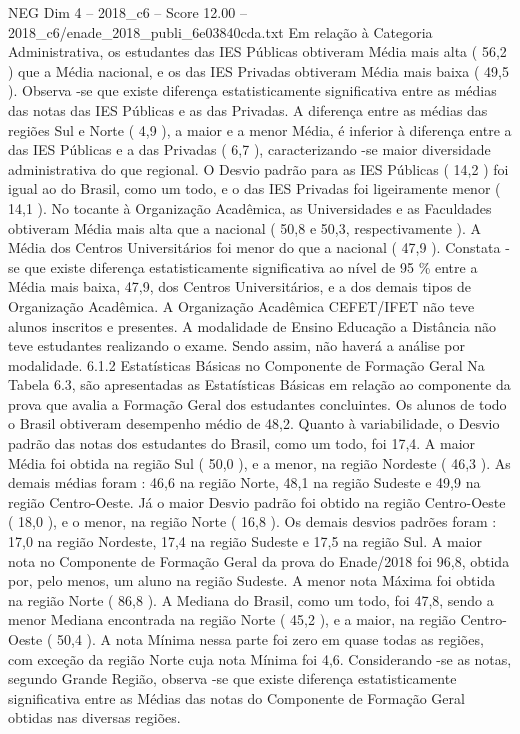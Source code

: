 \begin{textsample}{NEG Dim 4 – 2018\_c6 – Score 12.00 – 2018\_c6/enade\_2018\_publi\_6e03840cda.txt}
Em relação à Categoria Administrativa, os estudantes das IES Públicas obtiveram Média mais alta ( 56,2 ) que a Média nacional, e os das IES Privadas obtiveram Média mais baixa ( 49,5 ).
Observa -se que existe diferença estatisticamente significativa entre as médias das notas das IES Públicas e as das Privadas.
A diferença entre as médias das regiões Sul e Norte ( 4,9 ), a maior e a menor Média, é inferior à diferença entre a das IES Públicas e a das Privadas ( 6,7 ), caracterizando -se maior diversidade administrativa do que regional.
O Desvio padrão para as IES Públicas ( 14,2 ) foi igual ao do Brasil, como um todo, e o das IES Privadas foi ligeiramente menor ( 14,1 ).
No tocante à Organização Acadêmica, as Universidades e as Faculdades obtiveram Média mais alta que a nacional ( 50,8 e 50,3, respectivamente ).
A Média dos Centros Universitários foi menor do que a nacional ( 47,9 ).
Constata -se que existe diferença estatisticamente significativa ao nível de 95 \% entre a Média mais baixa, 47,9, dos Centros Universitários, e a dos demais tipos de Organização Acadêmica.
A Organização Acadêmica CEFET/IFET não teve alunos inscritos e presentes.
A modalidade de Ensino Educação a Distância não teve estudantes realizando o exame.
Sendo assim, não haverá a análise por modalidade. 6.1.2 Estatísticas Básicas no Componente de Formação Geral Na Tabela 6.3, são apresentadas as Estatísticas Básicas em relação ao componente da prova que avalia a Formação Geral dos estudantes concluintes.
Os alunos de todo o Brasil obtiveram desempenho médio de 48,2.
Quanto à variabilidade, o Desvio padrão das notas dos estudantes do Brasil, como um todo, foi 17,4.
A maior Média foi obtida na região Sul ( 50,0 ), e a menor, na região Nordeste ( 46,3 ).
As demais médias foram : 46,6 na região Norte, 48,1 na região Sudeste e 49,9 na região Centro-Oeste.
Já o maior Desvio padrão foi obtido na região Centro-Oeste ( 18,0 ), e o menor, na região Norte ( 16,8 ).
Os demais desvios padrões foram : 17,0 na região Nordeste, 17,4 na região Sudeste e 17,5 na região Sul.
A maior nota no Componente de Formação Geral da prova do Enade/2018 foi 96,8, obtida por, pelo menos, um aluno na região Sudeste.
A menor nota Máxima foi obtida na região Norte ( 86,8 ).
A Mediana do Brasil, como um todo, foi 47,8, sendo a menor Mediana encontrada na região Norte ( 45,2 ), e a maior, na região Centro-Oeste ( 50,4 ).
A nota Mínima nessa parte foi zero em quase todas as regiões, com exceção da região Norte cuja nota Mínima foi 4,6.
Considerando -se as notas, segundo Grande Região, observa -se que existe diferença estatisticamente significativa entre as Médias das notas do Componente de Formação Geral obtidas nas diversas regiões.

\end{textsample}
